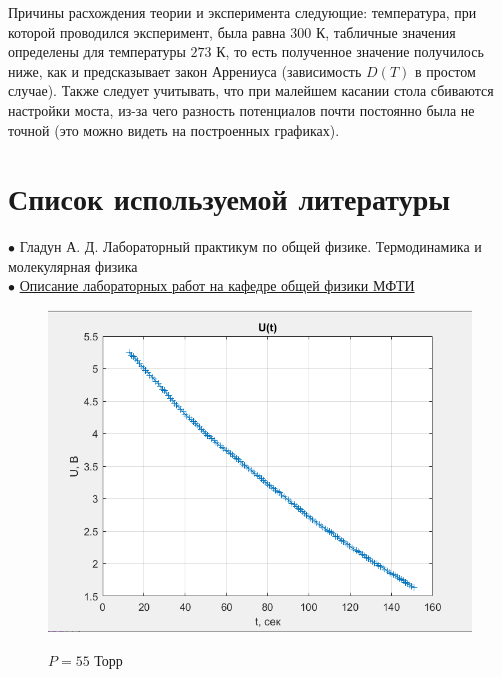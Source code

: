 \documentclass[a4paper, 12pt]{article} %
\begin{document}
Причины расхождения теории и эксперимента следующие: температура, при которой проводился эксперимент, была равна $300$ К, табличные значения определены для температуры $273$ К, то есть полученное значение получилось ниже, как и предсказывает закон Аррениуса (зависимость $D(T)$ в простом случае). Также следует учитывать, что при малейшем касании стола сбиваются настройки моста, из-за чего разность потенциалов почти постоянно была не точной (это можно видеть на построенных графиках).


\section{Список используемой литературы}

$\bullet$ Гладун А. Д. Лабораторный практикум по общей физике. Термодинамика и молекулярная физика\\

$\bullet$ \href{https://mipt.ru/education/chair/physics/S_II/lab/}{Описание лабораторных работ на кафедре общей физики МФТИ}

\newpage
\begin{figure}[h]
    \centering
    \includegraphics[width = 12 cm]{1gr55}
    \label{fig:vac}
    
    \begin{center}
		\caption{$P = 55$ Торр}
    \end{center}
\end{figure} 
\end{document}

